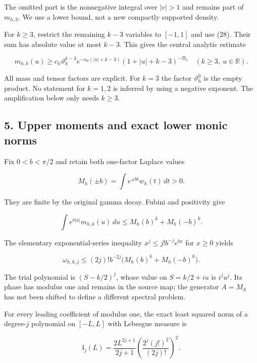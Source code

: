 The omitted part is the nonnegative integral over \(|v|>1\) and remains part of \(m_{h,3}\). We use a lower bound, not a new compactly supported density.

For \(k\ge3\), restrict the remaining \(k-3\) variables to \([-1,1]\) and use (28). Their sum has absolute value at most \(k-3\). This gives the central analytic estimate

\[
 \boxed{
 m_{h,k}(u)\ge
 c_h\vartheta_h^{k-3}
 e^{-\alpha_0(|u|+k-3)}
 (1+|u|+k-3)^{-B_h}
 \quad(k\ge3,\ u\in\mathbb R).}                                       \tag{29}
\]

All mass and tensor factors are explicit. For \(k=3\) the factor \(\vartheta_h^0\) is the empty product. No statement for \(k=1,2\) is inferred by using a negative exponent. The amplification below only needs \(k\ge3\).

\subsection{5. Upper moments and exact lower monic norms}\label{zlm:endpoint-arithmetic_original--upper-moments-and-exact-lower-monic-norms}

Fix \(0<b<\pi/2\) and retain both one-factor Laplace values

\[
 M_h(\pm b)=\int e^{\pm bt}w_h(t)\,dt>0.                               \tag{30}
\]

They are finite by the original gamma decay. Fubini and positivity give

\[
 \int e^{b|u|}m_{h,k}(u)\,du
 \le M_h(b)^k+M_h(-b)^k.                                                \tag{31}
\]

The elementary exponential-series inequality \(x^j\le j!b^{-j}e^{bx}\) for \(x\ge0\) yields

\[
 \omega_{h,k,j}
 \le (2j)!b^{-2j}\bigl(M_h(b)^k+M_h(-b)^k\bigr).                       \tag{32}
\]

The trial polynomial is \((S-k/2)^j\), whose value on \(S=k/2+iu\) is \(i^ju^j\). Its phase has modulus one and remains in the source map; the generator \(A=M_S\) has not been shifted to define a different spectral problem.

For every leading coefficient of modulus one, the exact least squared norm of a degree-\(j\) polynomial on \([-L,L]\) with Lebesgue measure is

\[
 \mathfrak l_j(L)=
 \frac{2L^{2j+1}}{2j+1}
       \left(\frac{2^j(j!)^2}{(2j)!}\right)^2.                           \tag{33}
\]

